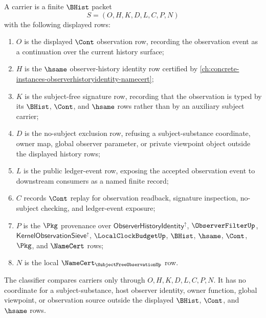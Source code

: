 \begin{definition}
\label{def:subject-free-observation-carrier}
A \SubjectFreeObservationUp carrier is a finite $\BHist$ packet
$$
S=(O,H,K,D,L,C,P,N)
$$
with the following displayed rows:
\begin{enumerate}
\item $O$ is the displayed $\Cont$ observation row, recording the observation event as a continuation over the current history surface;
\item $H$ is the $\hsame$ observer-history identity row certified by \autoref{ch:concrete-instances-observerhistoryidentity-namecert};
\item $K$ is the subject-free signature row, recording that the observation is typed by its $\BHist$, $\Cont$, and $\hsame$ rows rather than by an auxiliary subject carrier;
\item $D$ is the no-subject exclusion row, refusing a subject-substance coordinate, owner map, global observer parameter, or private viewpoint object outside the displayed history rows;
\item $L$ is the public ledger-event row, exposing the accepted observation event to downstream consumers as a named finite record;
\item $C$ records $\Cont$ replay for observation readback, signature inspection, no-subject checking, and ledger-event exposure;
\item $P$ is the $\Pkg$ provenance over $\mathsf{ObserverHistoryIdentity}^{\uparrow}$, $\ObserverFilterUp$, $\mathsf{KernelObservationSieve}^{\uparrow}$, $\LocalClockBudgetUp$, $\BHist$, $\hsame$, $\Cont$, $\Pkg$, and $\NameCert$ rows;
\item $N$ is the local $\NameCert_{\SubjectFreeObservationUp}$ row.
\end{enumerate}
The classifier compares carriers only through $O,H,K,D,L,C,P,N$. It has no coordinate for a subject-substance, host observer identity, owner function, global viewpoint, or observation source outside the displayed $\BHist$, $\Cont$, and $\hsame$ rows.
\end{definition}


